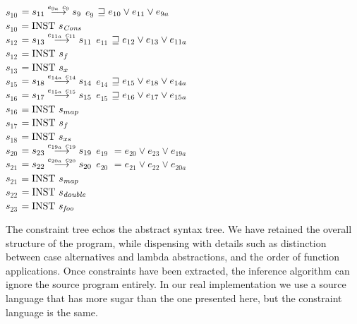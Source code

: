 \begin{tabbing}
\\
	\>		\>		\> \> \> $s_{10}$	\> $ = s_{11} \stackrel{e_{9a} \ c_9}{\longrightarrow} s_9$ 
	\>		\>		\> \> \> $e_9$		\> $\sqsupseteq e_{10} \lor e_{11} \lor e_{9a}$ 
\\[1ex]
	\>		\>		\> \> \> $s_{10}$	\> $= \textrm{INST} \ s_{\operatorname{\mathit{Cons}}}$  
\\[1ex]
	\>		\>		\> \> \> $s_{12}$ 	\> $= s_{13} \stackrel{e_{11a} \ c_{11}}{\longrightarrow} s_{11}$ 
	\>		\>		\> \> \> $e_{11}$ 	\> $\sqsupseteq e_{12} \lor e_{13} \lor e_{11a}$  
\\[1ex]
	\>		\>		\> \> \> $s_{12}$	\> $= \textrm{INST} \ s_f$ \\
	\>		\>		\> \> \> $s_{13}$	\> $= \textrm{INST} \ s_x$ \\
	\>		\>		\> \> \> $s_{15}$	\> $= s_{18} \stackrel{e_{14a} \ c_{14}}{\longrightarrow} s_{14}$ 
	\>		\>		\> \> \> $e_{14}$	\> $\sqsupseteq e_{15} \lor e_{18} \lor e_{14a}$ 
\\[1ex]
	\>		\>		\> \> \> $s_{16}$	\> $= s_{17} \stackrel{e_{15a} \ c_{15}}{\longrightarrow} s_{15}$ 
	\>		\>		\> \> \> $e_{15}$	\> $\sqsupseteq e_{16} \lor e_{17} \lor e_{15a}$ 
\\[1ex]
	\>		\>		\> \> \> $s_{16}$	\> $= \textrm{INST} \ s_{map}$ \\
	\>		\>		\> \> \> $s_{17}$	\> $= \textrm{INST} \ s_{f}$ \\
	\>		\>		\> \> \> $s_{18}$	\> $= \textrm{INST} \ s_{xs}$
\\[1ex]
	\> $s_{20}$	\> $= s_{23} \stackrel{e_{19a} \ c_{19}}{\longrightarrow} s_{19}$ \> \> \>
	\> $e_{19}$	\> $= e_{20} \lor e_{23} \lor e_{19a}$ 
\\[1ex]
	\> $s_{21}$	\> $= s_{22} \stackrel{e_{20a} \ c_{20}}{\longrightarrow} s_{20}$ \> \> \>
	\> $e_{20}$	\> $= e_{21} \lor e_{22} \lor e_{20a}$
\\[1ex]
	\> $s_{21}$	\> $= \textrm{INST} \ s_{\operatorname{\mathit{map}}}$ \\
	\> $s_{22}$	\> $= \textrm{INST} \ s_{\operatorname{\mathit{double}}}$ \\
	\> $s_{23}$	\> $= \textrm{INST} \ s_{\operatorname{\mathit{foo}}}$ 
\end{tabbing}

\clearpage{}

The constraint tree echos the abstract syntax tree. We have retained the overall structure of the program, while dispensing with details such as distinction between case alternatives and lambda abstractions, and the order of function applications. Once constraints have been extracted, the inference algorithm can ignore the source program entirely. In our real implementation we use a source language that has more sugar than the one presented here, but the constraint language is the same.


